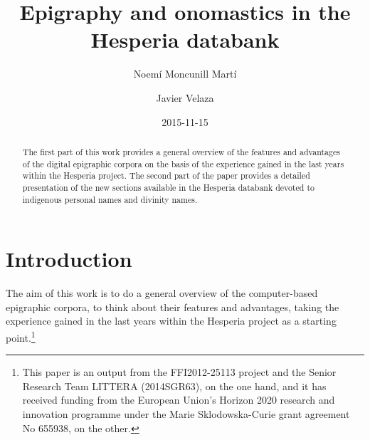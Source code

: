 \documentclass[amsthm,ebook]{saparticle}
\title{Epigraphy and onomastics in the Hesperia databank}
\author[barc]{Noemí Moncunill Martí}
\author[sorb]{Javier Velaza \corref{first}}
\date{2015-11-15}
\begin{document}
\maketitle
\begin{abstract}
The first part of this work provides a general overview of the features and advantages of the digital epigraphic corpora
on the basis of the experience gained in the last years within the Hesperia project. The second part of the paper
provides a detailed presentation of the new sections available in the Hesperia databank devoted to indigenous personal
names and divinity names.
\end{abstract}

 
\section{Introduction}


\noindent The aim of this work is to do a general overview of the computer-based epigraphic corpora, to think about their features
and advantages, taking the experience gained in the last years within the Hesperia project as a starting point.\footnote{ This paper is an output from the FFI2012-25113 project and the Senior Research Team LITTERA
(2014SGR63), on the one hand, and it has received funding from the European Union’s Horizon 2020 research and innovation programme under the Marie Sklodowska-Curie grant agreement No 655938, on the other.}
\end{document}
